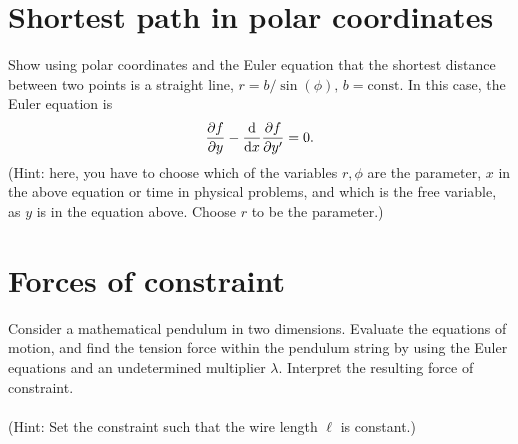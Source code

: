 \documentclass{article}
\begin{document}
    \section{Shortest path in polar coordinates}
        Show using polar coordinates and the Euler equation that the shortest distance between two points is a straight line, $r = b / \sin(\phi), \, b = \mathrm{const}$. In this case, the Euler equation is
        \begin{equation*}
            \pdv{f}{y} - \dv{x} \pdv{f}{y'} = 0.
        \end{equation*}
        (Hint: here, you have to choose which of the variables $r, \phi$ are the parameter, $x$ in the above equation or time in physical problems, and which is the free variable, as $y$ is in the equation above. Choose $r$ to be the parameter.)

    \section{Forces of constraint}
        Consider a mathematical pendulum in two dimensions. 
        Evaluate the equations of motion, and find the tension force within the pendulum string by using the Euler equations and an undetermined multiplier $\lambda$. 
        Interpret the resulting force of constraint. 
        \\ \\ 
        (Hint: Set the constraint such that the wire length $\ell$ is constant.)
\end{document}
